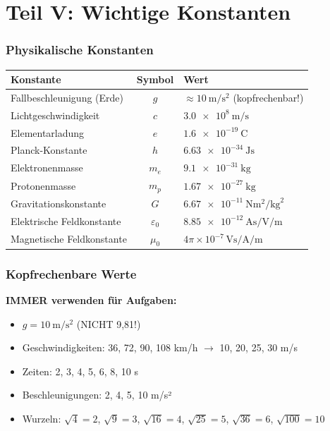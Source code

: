 \documentclass[11pt,a4paper]{article}
\begin{document}
\newpage
\part*{Teil V: Wichtige Konstanten}

\section{Physikalische Konstanten}

\begin{center}
\begin{tabular}{l|c|l}
\rowcolor{lightblue}
\textbf{Konstante} & \textbf{Symbol} & \textbf{Wert} \\
\hline
Fallbeschleunigung (Erde) & $g$ & $\approx \SI{10}{\metre\per\second\squared}$ (kopfrechenbar!) \\
\rowcolor{lightgray}
Lichtgeschwindigkeit & $c$ & $\SI{3,0e8}{\metre\per\second}$ \\
Elementarladung & $e$ & $\SI{1,6e-19}{\coulomb}$ \\
\rowcolor{lightgray}
Planck-Konstante & $h$ & $\SI{6,63e-34}{\joule\second}$ \\
Elektronenmasse & $m_e$ & $\SI{9,1e-31}{\kilogram}$ \\
\rowcolor{lightgray}
Protonenmasse & $m_p$ & $\SI{1,67e-27}{\kilogram}$ \\
Gravitationskonstante & $G$ & $\SI{6,67e-11}{\newton\metre\squared\per\kilogram\squared}$ \\
\rowcolor{lightgray}
Elektrische Feldkonstante & $\varepsilon_0$ & $\SI{8,85e-12}{\ampere\second\per\volt\per\metre}$ \\
Magnetische Feldkonstante & $\mu_0$ & $4\pi \times 10^{-7}\,\si{\volt\second\per\ampere\per\metre}$ \\
\hline
\end{tabular}
\end{center}

\section{Kopfrechenbare Werte}

\begin{wichtigbox}
\textbf{IMMER verwenden für Aufgaben:}
\begin{itemize}[leftmargin=0.5cm, itemsep=2pt]
\item $g = \SI{10}{\metre\per\second\squared}$ (NICHT 9,81!)
\item Geschwindigkeiten: 36, 72, 90, 108 km/h $\rightarrow$ 10, 20, 25, 30 m/s
\item Zeiten: 2, 3, 4, 5, 6, 8, 10 s
\item Beschleunigungen: 2, 4, 5, 10 m/s²
\item Wurzeln: $\sqrt{4}=2$, $\sqrt{9}=3$, $\sqrt{16}=4$, $\sqrt{25}=5$, $\sqrt{36}=6$, $\sqrt{100}=10$
\end{itemize}
\end{wichtigbox}
\end{document}

